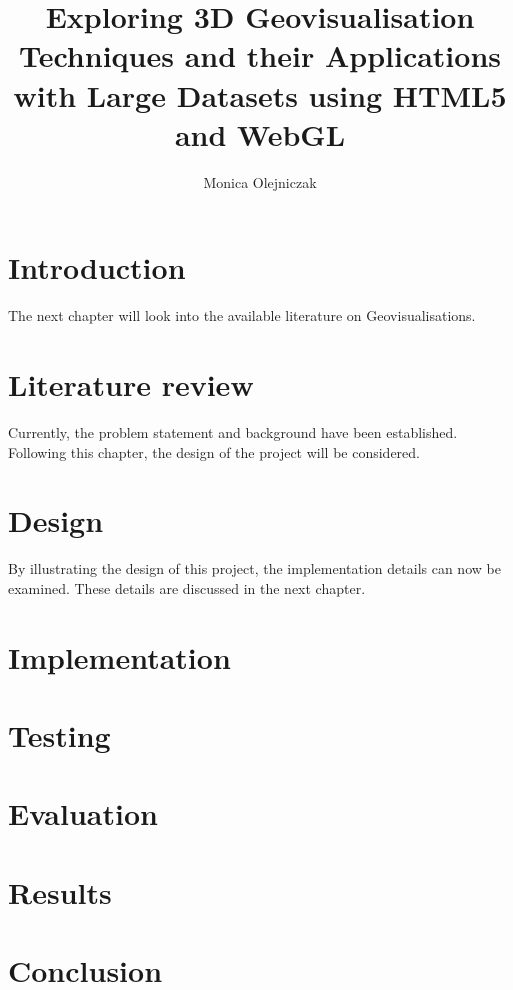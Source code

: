 \documentclass[
	paper=A4,
    titlepage=true,
	fontsize=11pt,
	parskip=half
]{scrreprt}
\title{Exploring 3D Geovisualisation Techniques and their Applications with Large Datasets using HTML5 and WebGL}
\author{Monica Olejniczak}
\begin{document}
	
	
	\chapter{Introduction} {
	\label{ch:introduction}
		
	}

	The next chapter will look into the available literature on Geovisualisations.

	\chapter{Literature review} {
	\label{ch:literature_review}
		
	}

	Currently, the problem statement and background have been established. Following this chapter, the design of the project will be considered.
	
	\chapter{Design} {
	\label{ch:design}
		
	}

	By illustrating the design of this project, the implementation details can now be examined. These details are discussed in the next chapter.
	
	\chapter{Implementation} {
	\label{ch:implementation}
		
	}


	\chapter{Testing} {
	\label{ch:testing}
		
	}


	\chapter{Evaluation} {
	\label{ch:evaluation}
		
	}


	\chapter{Results} {
	\label{ch:results}
		
	}


	\chapter{Conclusion} {
	\label{ch:conclusion}
		
	}
	
	\renewcommand{\bibname}{References}
	\printbibliography[notcategory=exclude]
	
\end{document}
